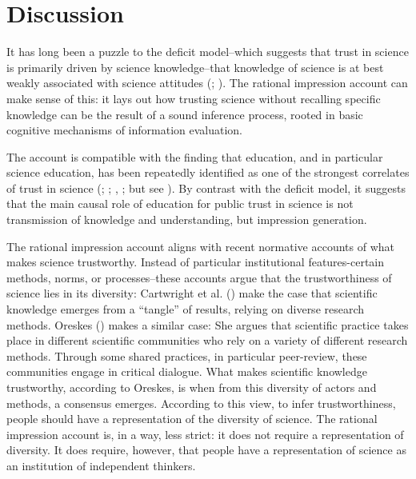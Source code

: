 \documentclass[
  jou,
  floatsintext,
  longtable,
  nolmodern,
  notxfonts,
  notimes,
  colorlinks=true,linkcolor=blue,citecolor=blue,urlcolor=blue]{apa7}
\begin{document}
\section{Discussion}\label{discussion}

It has long been a puzzle to the deficit model--which suggests that
trust in science is primarily driven by science knowledge--that
knowledge of science is at best weakly associated with science attitudes
(;
). The rational
impression account can make sense of this: it lays out how trusting
science without recalling specific knowledge can be the result of a
sound inference process, rooted in basic cognitive mechanisms of
information evaluation.

The account is compatible with the finding that education, and in
particular science education, has been repeatedly identified as one of
the strongest correlates of trust in science
(;
;
,
; but
see ). By contrast with the deficit model, it suggests that the main
causal role of education for public trust in science is not transmission
of knowledge and understanding, but impression generation.

The rational impression account aligns with recent normative accounts of
what makes science trustworthy. Instead of particular institutional
features-certain methods, norms, or processes--these accounts argue that
the trustworthiness of science lies in its diversity: Cartwright et al.
() make the
case that scientific knowledge emerges from a ``tangle'' of results,
relying on diverse research methods. Oreskes
() makes a similar case:
She argues that scientific practice takes place in different scientific
communities who rely on a variety of different research methods. Through
some shared practices, in particular peer-review, these communities
engage in critical dialogue. What makes scientific knowledge
trustworthy, according to Oreskes, is when from this diversity of actors
and methods, a consensus emerges. According to this view, to infer
trustworthiness, people should have a representation of the diversity of
science. The rational impression account is, in a way, less strict: it
does not require a representation of diversity. It does require,
however, that people have a representation of science as an institution
of independent thinkers.
\end{document}
